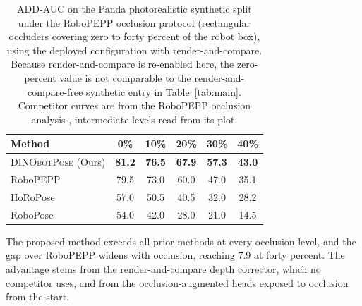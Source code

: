 \begin{table}[t!]
\centering
\renewcommand{\arraystretch}{1.1}
\begin{tabular}{@{} l ccccc @{}}
\toprule
\textbf{Method} & \textbf{0\%} & \textbf{10\%} & \textbf{20\%} & \textbf{30\%} & \textbf{40\%} \\
\midrule
\textsc{DINObotPose} (Ours) & \textbf{81.2} & \textbf{76.5} & \textbf{67.9} & \textbf{57.3} & \textbf{43.0} \\
RoboPEPP & 79.5 & 73.0 & 60.0 & 47.0 & 35.1 \\
HoRoPose & 57.0 & 50.5 & 40.5 & 32.0 & 28.2 \\
RoboPose & 54.0 & 42.0 & 28.0 & 21.0 & 14.5 \\
\bottomrule
\end{tabular}
\caption{ADD-AUC on the Panda photorealistic synthetic split under the RoboPEPP occlusion protocol (rectangular occluders covering zero to forty percent of the robot box), using the deployed configuration with render-and-compare. Because render-and-compare is re-enabled here, the zero-percent value is not comparable to the render-and-compare-free synthetic entry in Table~\ref{tab:main}. Competitor curves are from the RoboPEPP occlusion analysis \cite{goswami2025robopepp}, intermediate levels read from its plot.}
\label{tab:occlusion}
\end{table}

The proposed method exceeds all prior methods at every occlusion level, and the gap over RoboPEPP widens with occlusion, reaching 7.9 at forty percent. The advantage stems from the render-and-compare depth corrector, which no competitor uses, and from the occlusion-augmented heads exposed to occlusion from the start.

